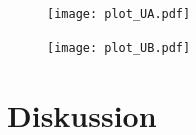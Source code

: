\begin{figure}[H]
    \centering
    \texttt{[image: plot\_UA.pdf]}
    \caption{} %
    \label{fig:a} %
\end{figure}

\begin{figure}[H]
    \centering
    \texttt{[image: plot\_UB.pdf]}
    \caption{} %
    \label{fig:b} %
\end{figure}


\section{Diskussion}



\newpage
\printbibliography

